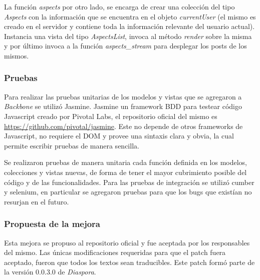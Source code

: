 La función \emph{aspects} por otro lado, se encarga de crear una colección del tipo \emph{Aspects} con la información que se encuentra en el objeto \emph{currentUser} (el mismo
es creado en el servidor y contiene toda la información relevante del usuario actual). Instancia una vista del tipo \emph{AspectsList}, invoca al método \emph{render} sobre la misma y
por último invoca a  la función \emph{aspects\_stream} para desplegar los posts de los mismos.

\subsubsection{Pruebas}

Para realizar las pruebas unitarias de los modelos y vistas que se agregaron a \emph{Backbone} se utilizó Jasmine. Jasmine un framework BDD para testear código Javascript creado por
Pivotal Labs, el repositorio oficial del mismo es \url{https://github.com/pivotal/jasmine}. Este no depende de otros frameworks de Javascript, no requiere el DOM y provee una
sintaxis clara y obvia, la cual permite escribir pruebas de manera sencilla.

Se realizaron pruebas de manera unitaria cada función definida en los modelos, colecciones y vistas nuevas, de forma de tener el mayor cubrimiento posible del código y de las
funcionalidades. Para las pruebas de integración se utilizó cumber y selenium, en particular se agregaron pruebas para que los bugs que existían no resurjan en el futuro.

\subsubsection{Propuesta de la mejora}

Esta mejora se propuso al repositorio oficial y fue aceptada por los responsables del mismo. Las únicas modificaciones requeridas para que el patch fuera aceptado, fueron que todos
los textos sean traducibles. Este patch formó parte de la versión 0.0.3.0 de \emph{Diaspora}.
